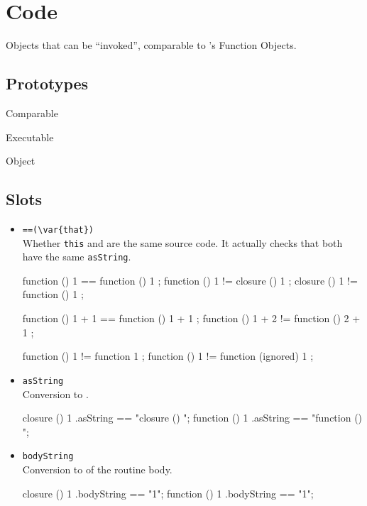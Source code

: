 \section{Code}

Objects that can be ``invoked'', comparable to \Cxx's Function Objects.

\subsection{Prototypes}

\begin{refObjects}
\item[Comparable]
\item[Executable]
\item[Object]
\end{refObjects}

\subsection{Slots}

\begin{itemize}
\item \lstinline|==(\var{that})|\\
  Whether \lstinline|this| and  are the same source code.
  It actually checks that both have the same \lstinline|asString|.
\begin{urbiassert}[firstnumber=last]
function () { 1 } == function () { 1 };
function () { 1 } != closure  () { 1 };
closure  () { 1 } != function () { 1 };

function () { 1 + 1 } == function () { 1 + 1 };
function () { 1 + 2 } != function () { 2 + 1 };

function () { 1 } != function { 1 };
function () { 1 } != function (ignored) { 1 };
\end{urbiassert}

\item \lstinline|asString|\\
  Conversion to .
\begin{urbiassert}[firstnumber=last]
closure  () { 1 }.asString == "closure () {\n}";
function () { 1 }.asString == "function () {\n}";
\end{urbiassert}

\item \lstinline|bodyString|\\
  Conversion to  of the routine body.
\begin{urbiassert}[firstnumber=last]
closure  () { 1 }.bodyString == "1";
function () { 1 }.bodyString == "1";
\end{urbiassert}

\end{itemize}

